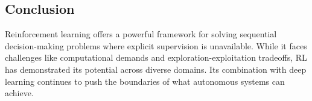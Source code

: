 \subsection*{Conclusion}

Reinforcement learning offers a powerful framework for solving sequential decision-making problems where explicit supervision is unavailable. While it faces challenges like computational demands and exploration-exploitation tradeoffs, RL has demonstrated its potential across diverse domains. Its combination with deep learning continues to push the boundaries of what autonomous systems can achieve.
